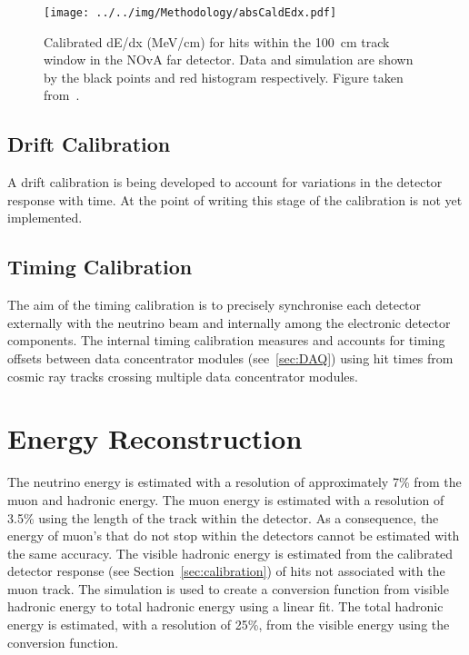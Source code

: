 \begin{figure}[h]
  \centering
  \texttt{[image: ../../img/Methodology/absCaldEdx.pdf]}
  \caption{
    Calibrated dE/dx (MeV/cm) for hits within the 100~cm track window
    in the NOvA far detector. 
    Data and simulation are shown by the black points and red
    histogram respectively.
    Figure taken from~\cite{lukeAbsCal}.
  } 
  \label{fig:calibrateddEdx}
\end{figure}


\subsection{Drift Calibration}

A drift calibration is being developed to account for variations in
the detector response with time. At the point of writing this stage of
the calibration is not yet implemented.


\subsection{Timing Calibration}

The aim of the timing calibration is to precisely synchronise each
detector externally with the neutrino beam and internally among
the electronic detector components. 
The internal timing calibration measures and accounts for timing
offsets between data concentrator modules (see~\ref{sec:DAQ}) using
hit times from cosmic ray tracks crossing multiple data concentrator
modules.~\cite{evanTiming}



\section{Energy Reconstruction}

The neutrino energy is estimated with a resolution of approximately 7\%
from the muon and hadronic energy. 
The muon energy is estimated with a resolution of 3.5\% using the
length of the track within the detector.  
As a consequence, the energy of muon's that do not stop within the
detectors cannot be estimated with the same accuracy. 
The visible hadronic energy is estimated from the calibrated
detector response (see Section~\ref{sec:calibration}) of hits not
associated with the muon track. 
The simulation is used to create a conversion function from visible
hadronic energy to total hadronic energy using a linear fit. 
The total hadronic energy is estimated, with a resolution of 25\%,
from the visible energy using the conversion function.~\cite{NOvASA} 


